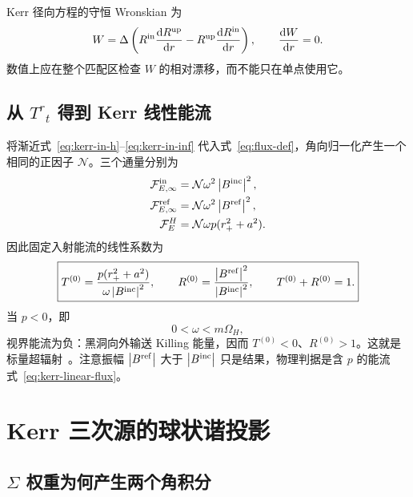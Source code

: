 \documentclass[UTF8,fontset=fandol,11pt,a4paper,oneside]{ctexart}
\numberwithin{equation}{section}
\newcommand{\dd}{\mathrm d}
\newcommand{\cF}{\mathcal F}
\newcommand{\rp}{r_+}
\newcommand{\Bin}{B^{\rm inc}}
\newcommand{\Bref}{B^{\rm ref}}
\newcommand{\Deltak}{\Delta}
\newcommand{\abs}[1]{\left|#1\right|}
\begin{document}
Kerr 径向方程的守恒 Wronskian 为
\begin{equation}
W=\Deltak\left(
R^{\rm in}\frac{\dd R^{\rm up}}{\dd r}
-R^{\rm up}\frac{\dd R^{\rm in}}{\dd r}
\right),
\qquad \frac{\dd W}{\dd r}=0.
\label{eq:kerr-W}
\end{equation}
数值上应在整个匹配区检查 $W$ 的相对漂移，而不能只在单点使用它。

\subsection{从 \texorpdfstring{$T^r{}_t$}{T-r-t} 得到 Kerr 线性能流}

将渐近式~\eqref{eq:kerr-in-h}--\eqref{eq:kerr-in-inf} 代入式~\eqref{eq:flux-def}，角向归一化产生一个相同的正因子 $\mathcal N$。三个通量分别为
\begin{align}
\cF_{E,\infty}^{\rm in}&=\mathcal N\omega^2\abs{\Bin}^2,\\
\cF_{E,\infty}^{\rm ref}&=\mathcal N\omega^2\abs{\Bref}^2,\\
\cF_E^H&=\mathcal N\omega p(\rp^2+a^2).
\end{align}
因此固定入射能流的线性系数为
\begin{equation}
\boxed{
T^{(0)}=\frac{p(\rp^2+a^2)}{\omega\abs{\Bin}^2},\qquad
R^{(0)}=\frac{\abs{\Bref}^2}{\abs{\Bin}^2},\qquad
T^{(0)}+R^{(0)}=1.}
\label{eq:kerr-linear-flux}
\end{equation}
当 $p<0$，即
\begin{equation}
0<\omega<m\Omega_H,
\end{equation}
视界能流为负：黑洞向外输送 Killing 能量，因而 $T^{(0)}<0$、$R^{(0)}>1$。这就是标量超辐射~\cite{StarobinskyChurilov,PressTeukolsky}。注意振幅 $\abs{\Bref}$ 大于 $\abs{\Bin}$ 只是结果，物理判据是含 $p$ 的能流式~\eqref{eq:kerr-linear-flux}。

\section{Kerr 三次源的球状谐投影}
\label{sec:kerr-source}

\subsection{\texorpdfstring{$\Sigma$}{Sigma} 权重为何产生两个角积分}
\end{document}
